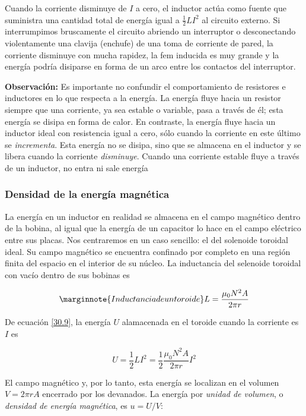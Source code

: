 Cuando la corriente disminuye de $I$ a cero, el inductor actúa como fuente que suministra una cantidad total de energía igual a $\frac{1}{2}LI^2$ al circuito externo. Si interrumpimos bruscamente el circuito abriendo un interruptor o desconectando violentamente una clavija (enchufe) de una toma de corriente de pared, la corriente disminuye con mucha rapidez, la fem inducida es muy grande y la energía podría disiparse en forma de un arco entre los contactos del interruptor.

\textbf{Observación:} Es importante no confundir el comportamiento de resistores e inductores en lo que respecta a la energía. La energía fluye hacia un resistor siempre que una corriente, ya sea estable o variable, pasa a través de él; esta energía se disipa en forma de calor. En contraste, la energía fluye hacia un inductor ideal con resistencia igual a cero, sólo cuando la corriente en este último se \textit{incrementa}. Esta energía no se disipa, sino que se almacena en el inductor y se libera cuando la corriente \textit{disminuye}. Cuando una corriente estable fluye a través de un inductor, no entra ni sale energía

\subsubsection{Densidad de la energía magnética}
La energía en un inductor en realidad se almacena en el campo magnético dentro de la bobina, al igual que la energía de un capacitor lo hace en el campo eléctrico entre sus placas. Nos centraremos en un caso sencillo: el del solenoide toroidal ideal. Su campo magnético se encuentra confinado por completo en una región finita del espacio en el interior de su núcleo. La inductancia del selenoide toroidal con vacío dentro de sus bobinas es 

\begin{equation}\label{L de un toroide}\marginnote{Inductancia de un toroide}
L=\frac{\mu_0N^2A}{2\pi r}
\end{equation}

De ecuación \ref{30.9}, la energía $U$ alamacenada en el toroide  cuando la corriente es $I$ es

\begin{equation*}
U=\frac{1}{2}LI^2=\frac{1}{2}\frac{\mu_0N^2A}{2\pi r}I^2
\end{equation*}

El campo magnético y, por lo tanto, esta energía se localizan en el volumen $V=2\pi rA$ encerrado por los devanados. La energía por \textit{unidad de volumen}, o \textit{densidad de energía magnética}, es $u=U/V$:

